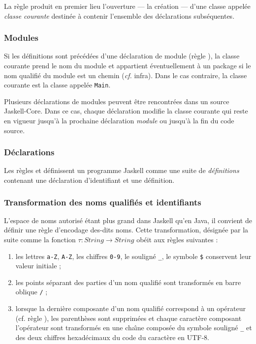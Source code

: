 La r\`egle   produit en premier lieu l'ouverture --- la
cr\'eation --- d'une classe appel\'ee \emph{classe courante}  destin\'ee \`a contenir l'ensemble
des d\'eclarations subs\'equentes. 

\subsubsection{Modules}

Si les d\'efinitions sont pr\'ec\'ed\'ees d'une d\'eclaration de module (r\`egle
), la classe courante prend le nom du module et
appartient \'eventuellement \`a un package si le nom qualifi\'e du module
est un chemin (\emph{cf.} infra). Dans le cas contraire, la classe
courante est la classe appel\'ee \texttt{Main}. 

Plusieurs d\'eclarations de modules peuvent \^etre rencontr\'ees dans un
source Jaskell-Core. Dans ce cas, chaque d\'eclaration modifie la classe
courante qui reste en vigueur jusqu'\`a la prochaine d\'eclaration
\emph{module} ou jusqu'\`a la fin du code source. 

\subsubsection{D\'eclarations}

Les r\`egles  et  d\'efinissent un programme
Jaskell comme une suite de \emph{d\'efinitions} contenant une
d\'eclaration d'identifiant et une d\'efinition. 

\subsubsection{Transformation des noms qualifi\'es et identifiants} 
\label{sec:transform-id}
L'espace de noms autoris\'e \'etant plus grand dans Jaskell qu'en Java, il
convient de d\'efinir une r\`egle d'encodage des-dits noms. Cette
transformation, d\'esign\'ee par la suite comme la fonction $\tau : String
\rightarrow String$ ob\'eit aux r\`egles suivantes :
\begin{enumerate}
  \item les lettres \texttt{a-Z}, \texttt{A-Z}, les chiffres
    \texttt{0-9}, le soulign\'e \texttt{\_}, le symbole \texttt{\$}
    conservent leur valeur initiale ;
  \item les points s\'eparant des parties d'un nom qualifi\'e sont
    transform\'es en barre oblique \texttt{/} ;
  \item lorsque la derni\`ere composante d'un nom qualifi\'e correspond \`a
    un op\'erateur (cf. r\`egle ), les parenth\`eses sont
    supprim\'ees et chaque caract\`ere composant l'op\'erateur sont
    transform\'es en une cha\^{\i}ne compos\'ee du symbole soulign\'e \texttt{\_}
    et des deux chiffres hexad\'ecimaux du code du caract\`ere en UTF-8.
\end{enumerate}

